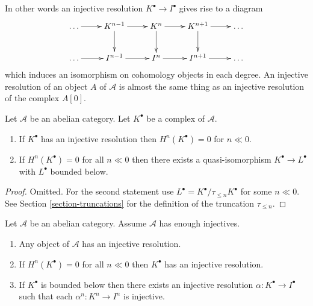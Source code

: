 \noindent
In other words an injective resolution $K^\bullet \to I^\bullet$
gives rise to a diagram
$$
\xymatrix{
\ldots \ar[r] & K^{n - 1} \ar[d] \ar[r] & K^n \ar[d] \ar[r] &
K^{n + 1} \ar[d] \ar[r] & \ldots \\
\ldots \ar[r] & I^{n - 1} \ar[r] & I^n \ar[r] & I^{n + 1} \ar[r] & \ldots
}
$$
which induces an isomorphism on cohomology objects in each degree.
An injective resolution of an object $A$ of $\mathcal{A}$
is almost the same thing as an injective resolution of
the complex $A[0]$.

\begin{lemma}
\label{lemma-cohomology-bounded-below}
Let $\mathcal{A}$ be an abelian category.
Let $K^\bullet$ be a complex of $\mathcal{A}$.
\begin{enumerate}
\item If $K^\bullet$ has an injective resolution then
$H^n(K^\bullet) = 0$ for $n \ll 0$.
\item If $H^n(K^\bullet) = 0$ for all $n \ll 0$ then there
exists a quasi-isomorphism $K^\bullet \to L^\bullet$
with $L^\bullet$ bounded below.
\end{enumerate}
\end{lemma}

\begin{proof}
Omitted. For the second statement use
$L^\bullet = K^\bullet / \tau_{\leq n}K^\bullet$ for
some $n \ll 0$. See Section \ref{section-truncations} for
the definition of the truncation $\tau_{\leq n}$.
\end{proof}

\begin{lemma}
\label{lemma-injective-resolutions-exist}
Let $\mathcal{A}$ be an abelian category.
Assume $\mathcal{A}$ has enough injectives.
\begin{enumerate}
\item Any object of $\mathcal{A}$ has an injective resolution.
\item If $H^n(K^\bullet) = 0$ for all $n \ll 0$ then
$K^\bullet$ has an injective resolution.
\item If $K^\bullet$ is bounded below then there exists
an injective resolution $\alpha : K^\bullet \to I^\bullet$
such that each $\alpha^n : K^n \to I^n$ is injective.
\end{enumerate}
\end{lemma}

